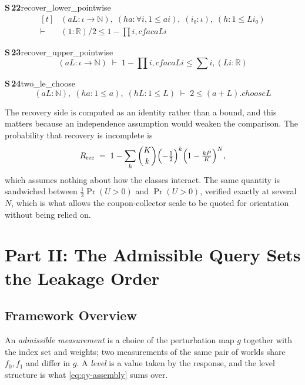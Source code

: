 \documentclass[conference]{IEEEtran}
\theoremstyle{definition}
\newcommand{\lean}[1]{\textsf{\footnotesize #1}}
\begin{document}
\noindent\textbf{S\,22}\quad\lean{recover\_lower\_pointwise}
{\footnotesize\[ \begin{aligned}[t]
&(\mathit{a} \mathit{L} : \iota \to \mathbb{N} ),\; (\mathit{ha} : \forall \mathit{i}, 1 \leq \mathit{a} \mathit{i}),\; (\mathit{i₀} : \iota ),\; (\mathit{h} : 1 \leq \mathit{L} \mathit{i₀})\\
\vdash\;&(1:\mathbb{R} ) / 2 \leq 1 - \textstyle\prod \mathit{i}, \mathit{cfac} \mathit{a} \mathit{L} \mathit{i}
\end{aligned} \]}

\noindent\textbf{S\,23}\quad\lean{recover\_upper\_pointwise}
{\footnotesize\[ (\mathit{a} \mathit{L} : \iota \to \mathbb{N} ) \;\vdash\; 1 - \textstyle\prod \mathit{i}, \mathit{cfac} \mathit{a} \mathit{L} \mathit{i} \leq \textstyle\sum \mathit{i}, (\mathit{L} \mathit{i} : \mathbb{R} ) \]}

\noindent\textbf{S\,24}\quad\lean{two\_le\_choose}
{\footnotesize\[ (\mathit{a} \mathit{L} : \mathbb{N} ),\; (\mathit{ha} : 1 \leq \mathit{a}),\; (\mathit{hL} : 1 \leq \mathit{L}) \;\vdash\; 2 \leq (\mathit{a} + \mathit{L}).\mathit{choose} \mathit{L} \]}


The recovery side is computed as an identity rather than a bound, and this matters because an
independence assumption would weaken the comparison. The probability that recovery is
incomplete is
\begin{equation}
R_{\mathrm{rec}}
\;=\;1-\sum_{k}\binom{K}{k}\Bigl(-\tfrac12\Bigr)^{k}
     \Bigl(1-\tfrac{kP}{K}\Bigr)^{N},
\label{eq:sp-recover}
\end{equation}
which assumes nothing about how the classes interact. The same quantity is sandwiched between
$\tfrac12\Pr(U>0)$ and $\Pr(U>0)$, verified exactly at several $N$, which is what allows the
coupon-collector scale to be quoted for orientation without being relied on.


\section{Part II: The Admissible Query Sets the Leakage Order}

\label{sec:qy-setting}

\subsection{Framework Overview}

An \emph{admissible measurement} is a choice of the perturbation map $g$ together with the
index set and weights; two measurements of the same pair of worlds share $f_{0},f_{1}$ and
differ in $g$. A \emph{level} is a value taken by the response, and the level structure is
what \eqref{eq:qy-assembly} sums over.
\end{document}
